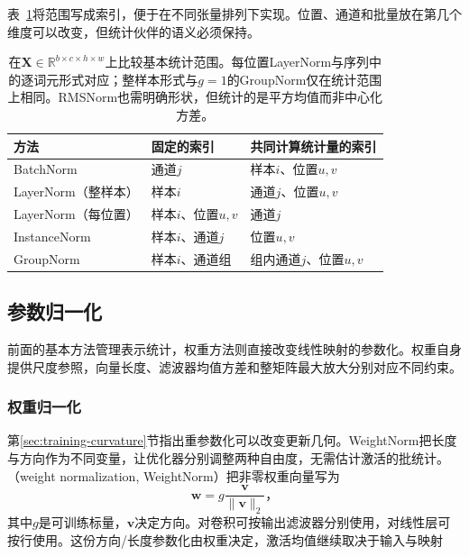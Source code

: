表~\ref{tab:training-normalization-axes}将范围写成索引，便于在不同张量排列下实现。位置、通道和批量放在第几个维度可以改变，但统计伙伴的语义必须保持。
\begin{table}[htbp]
  \centering\small
  \begin{tabularx}{\linewidth}{@{}p{35mm}p{43mm}X@{}}
    \toprule
    方法 & 固定的索引 & 共同计算统计量的索引 \\
    \midrule
    BatchNorm & 通道$j$ & 样本$i$、位置$u,v$ \\
    LayerNorm（整样本） & 样本$i$ & 通道$j$、位置$u,v$ \\
    LayerNorm（每位置） & 样本$i$、位置$u,v$ & 通道$j$ \\
    InstanceNorm & 样本$i$、通道$j$ & 位置$u,v$ \\
    GroupNorm & 样本$i$、通道组 & 组内通道$j$、位置$u,v$ \\
    \bottomrule
  \end{tabularx}
  \caption{在$\bm X\in\mathbb R^{b\times c\times h\times w}$上比较基本统计范围。每位置LayerNorm与序列中的逐词元形式对应；整样本形式与$g=1$的GroupNorm仅在统计范围上相同。RMSNorm也需明确形状，但统计的是平方均值而非中心化方差。}
  \label{tab:training-normalization-axes}
\end{table}
\FloatBarrier

\subsection{参数归一化}
\label{sec:training-parameter-normalization-methods}
\label{sec:training-weight-normalization-methods}
前面的基本方法管理表示统计，权重方法则直接改变线性映射的参数化。权重自身提供尺度参照，向量长度、滤波器均值方差和整矩阵最大放大分别对应不同约束。

\subsubsection{权重归一化}
\label{sec:training-weightnorm}
第\ref{sec:training-curvature}节指出重参数化可以改变更新几何。WeightNorm把长度与方向作为不同变量，让优化器分别调整两种自由度，无需估计激活的批统计。（weight normalization, WeightNorm）把非零权重向量写为
\begin{equation}
  \bm w=g\frac{\bm v}{\lVert\bm v\rVert_2}\text{，}
  \label{eq:training-weightnorm}
\end{equation}
其中$g$是可训练标量，$\bm v$决定方向。对卷积可按输出滤波器分别使用，对线性层可按行使用。这份方向/长度参数化由权重决定，激活均值继续取决于输入与映射

